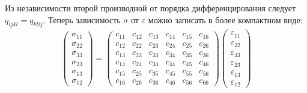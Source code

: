 Из независимости второй производной от порядка дифференцирования следует $q_{ijkl} = q_{klij}$. Теперь зависимость $\sigma$ от $\varepsilon$ можно записать в более компактном виде:
\begin{align}
\left( \begin{array}{cccccccccccc}
\sigma_{11} \\
\sigma_{22} \\
\sigma_{33} \\
\sigma_{23} \\
\sigma_{13} \\
\sigma_{12} 
\end{array} \right){}
= \left( \begin{array}{cccccccccccc}
c_{11} & c_{12} & c_{13} & c_{14} & c_{15} & c_{16} \\ 
c_{12} & c_{22} & c_{23} & c_{24} & c_{25} & c_{26} \\ 
c_{13} & c_{23} & c_{33} & c_{34} & c_{35} & c_{36} \\ 
c_{14} & c_{24} & c_{34} & c_{44} & c_{45} & c_{46} \\ 
c_{15} & c_{25} & c_{35} & c_{45} & c_{55} & c_{56} \\ 
c_{16} & c_{26} & c_{36} & c_{46} & c_{56} & c_{66}
\end{array} \right){}
\left( \begin{array}{cccccccccccc}
\varepsilon_{11} \\
\varepsilon_{22} \\
\varepsilon_{33} \\
\varepsilon_{23} \\
\varepsilon_{13} \\
\varepsilon_{12}
\end{array} \right)
\end{align}


